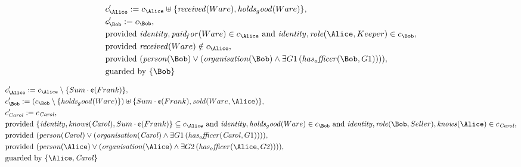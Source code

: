 \begin{align*}
&
c'_
{
\Alice
}
 := 
c_
{
\Alice
}
 \uplus 
\{
\mathit{
received
}
(
Ware
)
,
\mathit{
holds_good
}
(
Ware
)
\}
,\\
&
c'_
{
\Bob
}
 := 
c_
{
\Bob
}
,\\
&
\text{provided } 
\mathit{
identity
}
,
\mathit{
paid_for
}
(
Ware
)
 \in c_
{
\Alice
}
 \text{ and } 
\mathit{
identity
}
,
\mathit{
role
}
(
\Alice
,
Keeper
)
 \in c_
{
\Bob
}
,\\
&
\text{provided } 
\mathit{
received
}
(
Ware
)
 \notin c_
{
\Alice
}
,\\
&
\text{provided } 
(
\mathit{
person
}
(
\Bob
)
\lor
(
\mathit{
organisation
}
(
\Bob
)
\land
\exists 
G1
\,(
\mathit{
has_officer
}
(
\Bob
,
G1
)
)
)
)
,\\
&
\text{guarded by } \{
\Bob
\}
\end{align*}

\begin{align*}
&
c'_
{
\Alice
}
 := 
c_
{
\Alice
}
 \setminus 
\{
Sum
\cdot
\text{\textcent}
(
Frank
)
\}
,\\
&
c'_
{
\Bob
}
 := 
(c_
{
\Bob
}
 \setminus 
\{
\mathit{
holds_good
}
(
Ware
)
\}
) \uplus 
\{
Sum
\cdot
\text{\textcent}
(
Frank
)
,
\mathit{
sold
}
(
Ware
,
\Alice
)
\}
,\\
&
c'_
{
\mathit{Carol}
}
 := 
c_
{
\mathit{Carol}
}
,\\
&
\text{provided } 
\{
\mathit{
identity
}
,
\mathit{
knows
}
(
\mathit{Carol}
)
,
Sum
\cdot
\text{\textcent}
(
Frank
)
\}
 \subseteq c_
{
\Alice
}
 \text{ and } 
\mathit{
identity
}
,
\mathit{
holds_good
}
(
Ware
)
 \in c_
{
\Bob
}
 \text{ and } 
\mathit{
identity
}
,
\mathit{
role
}
(
\Bob
,
Seller
)
,
\mathit{
knows
}
(
\Alice
)
 \in c_
{
\mathit{Carol}
}
,\\
&
\text{provided } 
(
\mathit{
person
}
(
\mathit{Carol}
)
\lor
(
\mathit{
organisation
}
(
\mathit{Carol}
)
\land
\exists 
G1
\,(
\mathit{
has_officer
}
(
\mathit{Carol}
,
G1
)
)
)
)
,\\
&
\text{provided } 
(
\mathit{
person
}
(
\Alice
)
\lor
(
\mathit{
organisation
}
(
\Alice
)
\land
\exists 
G2
\,(
\mathit{
has_officer
}
(
\Alice
,
G2
)
)
)
)
,\\
&
\text{guarded by } \{
\Alice
,
\mathit{Carol}
\}
\end{align*}
